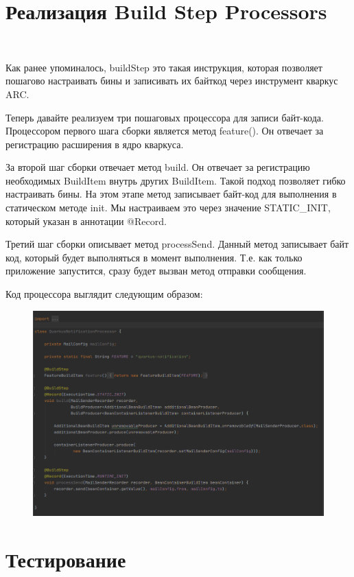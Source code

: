 \documentclass[russian,11pt]{article}
\begin{document}
\section{Реализация Build Step Processors}
~

Как ранее упоминалось, buildStep это такая инструкция, которая позволяет пошагово настраивать бины и записивать их байткод через инструмент кваркус ARC.

	Теперь давайте реализуем три пошаговых процессора для записи байт-кода. 
Процессором первого шага сборки является метод feature(). Он отвечает за регистрацию расширения в ядро кваркуса.

	За второй шаг сборки отвечает метод build. Он отвечает за регистрацию необходимых BuildItem внутрь других BuildItem. Такой подход позволяет гибко настраивать бины. На этом этапе метод записывает байт-код для выполнения в статическом методе init. Мы настраиваем это через значение STATIC\_INIT, который указан в аннотации @Record.

	Третий шаг сборки описывает метод processSend. Данный метод записывает байт код, который будет выполняться в момент выполнения. Т.е. как только приложение запустится, сразу будет вызван метод отправки сообщения. 


Код процессора выглядит следующим образом:

\begin{figure}[H]
	\centering
	\includegraphics[width=\textwidth]{10}
\end{figure}

\newpage
\section{Тестирование}
\end{document}
